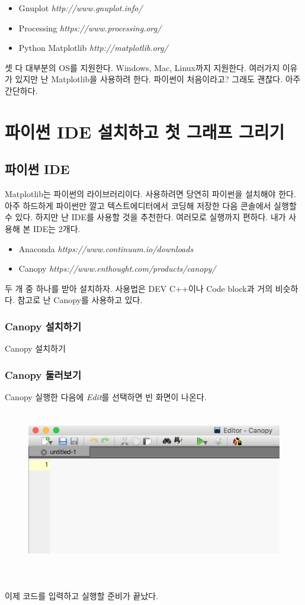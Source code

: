 \documentclass[12pt]{article}
\begin{document}
	\begin{itemize}
		\item Gnuplot \textit{http://www.gnuplot.info/}
		\item Processing \textit{https://www.processing.org/}
		\item Python Matplotlib \textit{http://matplotlib.org/}
	\end{itemize}
	셋 다 대부분의 OS를 지원한다. Windows, Mac, Linux까지 지원한다. 여러가지 이유가 있지만 난 Matplotlib을 사용하려 한다. 파이썬이 처음이라고? 그래도 괜찮다. 아주 간단하다.
	
	\clearpage
	
	\section{파이썬 IDE 설치하고 첫 그래프 그리기}
		\subsection{파이썬 IDE}
			Matplotlib는 파이썬의 라이브러리이다. 사용하려면 당연히 파이썬을 설치해야 한다. 아주 하드하게 파이썬만 깔고 텍스트에디터에서 코딩해 저장한 다음 콘솔에서 실행할 수 있다. 하지만 난 IDE를 사용할 것을 추천한다. 여러모로 실행까지 편하다. 내가 사용해 본 IDE는 2개다.
			\begin{itemize}
				\item Anaconda \textit{https://www.continuum.io/downloads}
				\item Canopy \textit{https://www.enthought.com/products/canopy/}
			\end{itemize}
			두 개 중 하나를 받아 설치하자. 사용법은 DEV C++이나 Code block과 거의 비슷하다. 참고로 난 Canopy를 사용하고 있다.
			\subsubsection{Canopy 설치하기}
				Canopy 설치하기
			\clearpage
			\subsubsection{Canopy 둘러보기}
				Canopy 실행한 다음에 \textit{Edit}를 선택하면 빈 화면이 나온다. 
				\begin{figure}[h]
					\begin{center}
						\includegraphics[height=7cm]{./images/2_2_b.png}
					\end{center}
				\end{figure}
				\\ 이제 코드를 입력하고 실행할 준비가 끝났다.
		\clearpage
\end{document}
